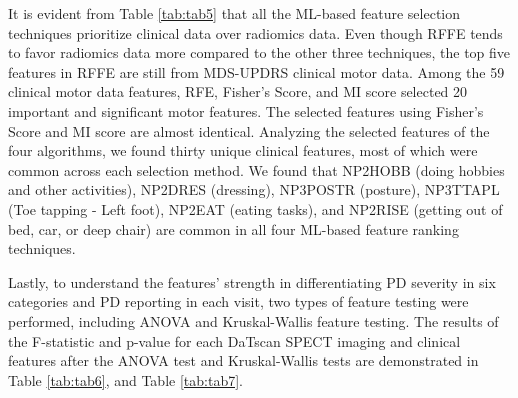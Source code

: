 \documentclass{article}
\begin{document}
It is evident from Table \ref{tab:tab5} that all the ML-based feature selection techniques prioritize clinical data over radiomics data. Even though RFFE tends to favor radiomics data more compared to the other three techniques, the top five features in RFFE are still from MDS-UPDRS clinical motor data. Among the 59 clinical motor data features, RFE, Fisher’s Score, and MI score selected 20 important and significant motor features. The selected features using Fisher’s Score and MI score are almost identical. Analyzing the selected features of the four algorithms, we found thirty unique clinical features, most of which were common across each selection method. We found that NP2HOBB (doing hobbies and other activities), NP2DRES (dressing), NP3POSTR (posture), NP3TTAPL (Toe tapping - Left foot), NP2EAT (eating tasks), and NP2RISE (getting out of bed, car, or deep chair) are common in all four ML-based feature ranking techniques.

Lastly, to understand the features' strength in differentiating PD severity in six categories and PD reporting in each visit, two types of feature testing were performed, including ANOVA and Kruskal-Wallis feature testing. The results of the F-statistic and p-value for each DaTscan SPECT imaging and clinical features after the ANOVA test and Kruskal-Wallis tests are demonstrated in Table \ref{tab:tab6}, and Table \ref{tab:tab7}. 
\end{document}
